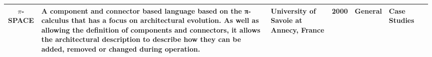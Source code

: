 \begin{landscape}
\begin{center}
\begin{longtable}{|c|p{6cm}|p{3cm}|c|p{3cm}|p{2cm}|c|}
\hline
$\pi$-SPACE & A component and connector based language based on the π-calculus that has a focus on architectural evolution. As well as allowing the definition of components and connectors, it allows the architectural description to describe how they can be added, removed or changed during operation. & University of Savoie at Annecy, France & 2000 & General & Case Studies & \cite{chaudet2000-pispace} \\
\hline


\end{longtable}
\end{center}
\end{landscape}
